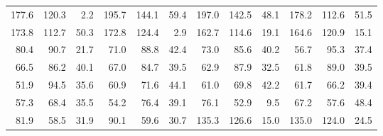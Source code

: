 \documentclass[draft]{article}
\begin{document}
\begin{table}
\begin{center}
\begin{tabular}{rrrrrrrrrrrr}
177.6&120.3&  2.2&195.7&144.1& 59.4&197.0&142.5& 48.1&178.2&112.6& 51.5\\
173.8&112.7& 50.3&172.8&124.4&  2.9&162.7&114.6& 19.1&164.6&120.9& 15.1\\
 80.4& 90.7& 21.7& 71.0& 88.8& 42.4& 73.0& 85.6& 40.2& 56.7& 95.3& 37.4\\
 66.5& 86.2& 40.1& 67.0& 84.7& 39.5& 62.9& 87.9& 32.5& 61.8& 89.0& 39.5\\
 51.9& 94.5& 35.6& 60.9& 71.6& 44.1& 61.0& 69.8& 42.2& 61.7& 66.2& 39.4\\
 57.3& 68.4& 35.5& 54.2& 76.4& 39.1& 76.1& 52.9&  9.5& 67.2& 57.6& 48.4\\
 81.9& 58.5& 31.9& 90.1& 59.6& 30.7&135.3&126.6& 15.0&135.0&124.0& 24.5\\
\hline
\end{tabular}
\end{center}
\end{table}
\clearpage
\end{document}
